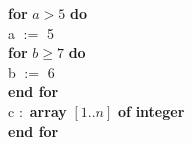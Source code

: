 \documentclass[a4paper,14pt]{article}
\newcommand\tab[1][0.5cm]{\hspace*{#1}}
\renewcommand{\geq}{\geqslant}
\numberwithin{equation}{section}
\begin{document}
\noindent\textbf{for}  $a>5$ \textbf{do} \\
\tab a $:=$ 5\\
\tab \textbf{for}  $b\geq7$ \textbf{do} \\
\tab \tab b $:=$ 6\\
\tab \textbf{end for}\\
\tab c $:$ \textbf{array}  $[1..n]$  \textbf{of} \textbf{integer} \\
\textbf{end for}\\
\end{document}
